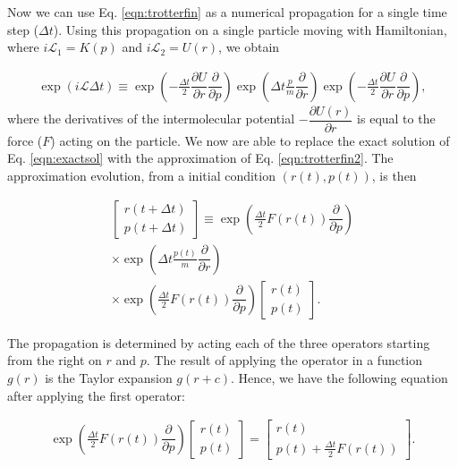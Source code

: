 Now we can use Eq. \ref{eqn:trotterfin} as a numerical propagation for a single time step ($\Delta t$). Using this propagation on a single particle moving with Hamiltonian, where $i\mathcal{L}_{1} = K (p)$ and $i\mathcal{L}_{2} = U (r)$, we obtain

\begin{equation}
\begin{aligned}
\exp (i\mathcal{L} \Delta t)  \equiv
\exp \left (-\frac{\Delta t}{2} \dfrac{\partial U}{\partial r} \dfrac{\partial}{\partial p} \right) \exp \left( \Delta t \frac{p}{m}\dfrac{\partial }{\partial r} \right)\exp \left (-\frac{\Delta t}{2} \dfrac{\partial U}{\partial r} \dfrac{\partial}{\partial p} \right) ,
\end{aligned}
\label{eqn:trotterfin2}
\end{equation} 
where the derivatives of the intermolecular potential $-\dfrac{\partial U(r)}{\partial r}$ is equal to the force ($F$) acting on the particle. We now are able to replace the exact solution of Eq. \ref{eqn:exactsol} with the approximation of Eq. \ref{eqn:trotterfin2}. The approximation evolution, from a initial condition $(r(t),p(t))$, is then

\begin{equation}
\begin{aligned}
\left[ \begin{array}{c} r(t+ \Delta t) \\ p(t + \Delta t) \end{array} \right] \equiv 
\exp \left (\frac{\Delta t}{2} F(r(t)) \dfrac{\partial}{\partial p} \right) \\
\times \exp \left( \Delta t \frac{p(t)}{m}\dfrac{\partial }{\partial r} \right) \\
\times \exp \left (\frac{\Delta t}{2} F(r(t)) \dfrac{\partial}{\partial p} \right)
\left[ \begin{array}{c} r(t) \\ p(t) \end{array} \right] .
\end{aligned}
\end{equation}

The propagation is determined by acting each of the three operators starting from the right on $r$ and $p$. The result of applying the operator in a function $g(r)$ is the Taylor expansion $g(r+c)$. Hence, we have the following equation after applying the first operator:

\begin{equation}
\begin{aligned}
\exp \left (\frac{\Delta t}{2} F(r(t)) \dfrac{\partial}{\partial p} \right)
\left[ \begin{array}{c} r(t) \\ p(t) \end{array} \right] = 
\left[ \begin{array}{c} r(t) \\ p(t) + \frac{\Delta t}{2} F(r(t)) \end{array} \right] .
\end{aligned}
\end{equation}

